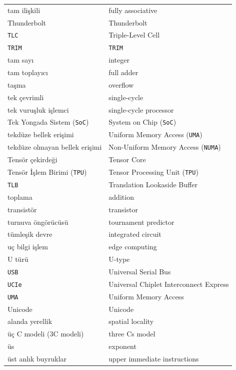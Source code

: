 {\begin{longtable}{@{}p{7.6cm}p{7.6cm}@{}}

tam ilişkili & fully associative \\
Thunderbolt & Thunderbolt \\
\texttt{TLC} & Triple-Level Cell \\
\texttt{TRIM} & \texttt{TRIM} \\
tam sayı & integer \\
tam toplayıcı & full adder \\
taşma & overflow \\
tek çevrimli & single-cycle \\
tek vuruşluk işlemci & single-cycle processor \\
Tek Yongada Sistem (\texttt{SoC}) & System on Chip (\texttt{SoC}) \\
tekdüze bellek erişimi & Uniform Memory Access (\texttt{UMA}) \\
tekdüze olmayan bellek erişimi & Non-Uniform Memory Access (\texttt{NUMA}) \\
Tensör çekirdeği & Tensor Core \\
Tensör İşlem Birimi (\texttt{TPU}) & Tensor Processing Unit (\texttt{TPU}) \\
\texttt{TLB} & Translation Lookaside Buffer \\
toplama & addition \\
transistör & transistor \\
turnuva öngörücüsü & tournament predictor \\
tümleşik devre & integrated circuit \\

uç bilgi işlem & edge computing \\
U türü & U-type \\
\texttt{USB} & Universal Serial Bus \\
\texttt{UCIe} & Universal Chiplet Interconnect Express \\
\texttt{UMA} & Uniform Memory Access \\
Unicode & Unicode \\
alanda yerellik & spatial locality \\

üç C modeli (3C modeli) & three Cs model \\
üs & exponent \\
üst anlık buyruklar & upper immediate instructions \\


\end{longtable}}
